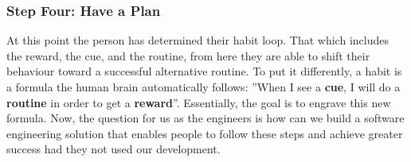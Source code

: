 \subsubsection*{Step Four: Have a Plan}
At this point the person has determined their habit loop. That which includes the reward, the cue, and the routine, from here they are able to shift their behaviour toward a successful alternative routine. To put it differently, a habit is a formula the human brain automatically follows: ”When I see a \textbf{cue}, I will do a \textbf{routine} in order to get a \textbf{reward}”. Essentially, the goal is to engrave this new formula. Now, the question for us as the engineers is how can we build a software engineering solution that enables people to follow these steps and achieve greater success had they not used our development.
